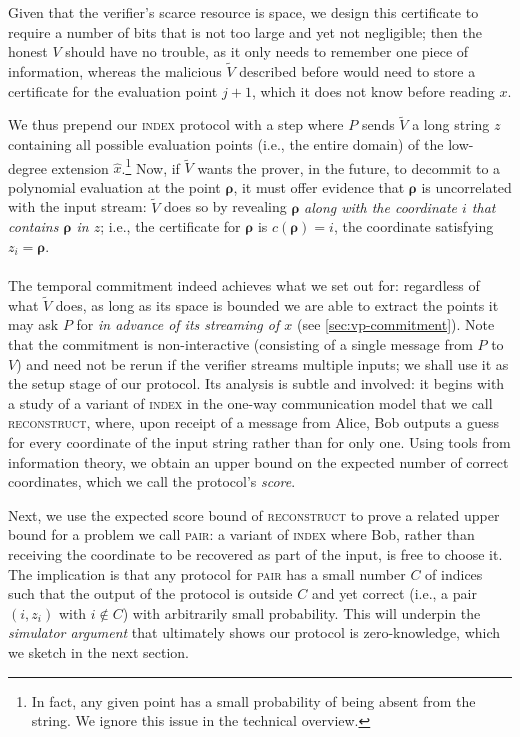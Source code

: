 \documentclass[10pt,a4paper]{article}
\newif\iflipics\lipicsfalse
\theoremstyle{definition}
\newcommand{\indexproblem}{\normalfont\textsc{index}\xspace}
\newcommand{\pair}{\normalfont\textsc{pair}\xspace}
\newcommand{\reconstruct}{\normalfont\textsc{reconstruct}\xspace}
\newcommand{\vcommitstring}{z}
\newcommand{\fingerprinttuple}{\bm{\rho}}
\begin{document}
    Given that the verifier's scarce resource is space, we design this certificate to require a number of bits that is not too large and yet not negligible; then the honest $V$ should have no trouble, as it only needs to remember one piece of information, whereas the malicious $\widetilde V$ described before would need to store a certificate for the evaluation point $j + 1$, which it does not know before reading $x$. 
    
    We thus prepend our \indexproblem protocol with a step where $P$ sends $\widetilde V$ a long string $\vcommitstring$ containing all possible evaluation points (i.e., the entire domain) of the low-degree extension $\hat x$.\footnote{In fact, any given point has a small probability of being absent from the string. We ignore this issue in the technical overview.} Now, if $\widetilde V$ wants the prover, in the future, to decommit to a polynomial evaluation at the point $\fingerprinttuple$, it must offer evidence that $\fingerprinttuple$ is uncorrelated with the input stream: $\widetilde V$ does so by revealing $\fingerprinttuple$ \emph{along with the coordinate $i$ that contains $\fingerprinttuple$ in $\vcommitstring$}; i.e., the certificate for $\fingerprinttuple$ is $c(\fingerprinttuple) = i$, the coordinate satisfying $\vcommitstring_i = \fingerprinttuple$.
    
    \iflipics\else\paragraph*{}\fi The temporal commitment indeed achieves what we set out for: regardless of what $\widetilde V$ does, as long as its space is bounded we are able to extract the points it may ask $P$ for \emph{in advance of its streaming of $x$} (see \cref{sec:vp-commitment}). Note that the commitment is non-interactive (consisting of a single message from $P$ to $V$) and need not be rerun if the verifier streams multiple inputs; we shall use it as the setup stage of our protocol. Its analysis is subtle and involved: it begins with a study of a variant of \indexproblem in the one-way communication model that we call \reconstruct, where, upon receipt of a message from Alice, Bob outputs a guess for every coordinate of the input string rather than for only one. Using tools from information theory, we obtain an upper bound on the expected number of correct coordinates, which we call the protocol's \emph{score}.
    
    Next, we use the expected score bound of \reconstruct to prove a related upper bound for a problem we call \pair: a variant of \indexproblem where Bob, rather than receiving the coordinate to be recovered as part of the input, is free to choose it. The implication is that any protocol for \pair has a small number $C$ of indices such that the output of the protocol is outside $C$ and yet correct (i.e., a pair $(i, \vcommitstring_i)$ with $i \notin C$) with arbitrarily small probability. This will underpin the \emph{simulator argument} that ultimately shows our protocol is zero-knowledge, which we sketch in the next section.
\end{document}

